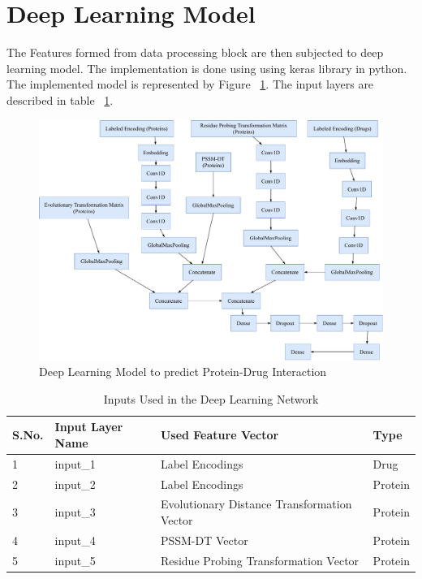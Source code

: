 
  \section{Deep Learning Model}
  
  The Features formed from data processing block are then subjected to deep learning model. The implementation is done using  using keras library in python. The implemented model is represented by Figure ~\ref{fig:dlm}. The input layers are described in table ~\ref{table:inputs}.
  
  \begin{figure}[H]
  \centering
  \includegraphics[width=1\linewidth]{mainmatter/3-Methodology/images/DeepDF.pdf}
  \caption{Deep Learning Model to predict Protein-Drug Interaction}
  \label{fig:dlm}
  \end{figure}
  \begin{table}[H]\centering
    \caption{Inputs Used in the Deep Learning Network} 
    \begin{tabular}{|l|l|l|l|}
      \hline 
      S.No. & Input Layer Name & Used Feature Vector & Type \\ \hline
      1 & input\_1 & Label Encodings & Drug \\ \hline
      2 & input\_2 & Label Encodings & Protein \\ \hline
      3 & input\_3 & Evolutionary Distance Transformation Vector& Protein \\ \hline
      4 & input\_4 & PSSM-DT Vector & Protein \\ \hline
      5 & input\_5 & Residue Probing Transformation Vector & Protein \\   \hline 
    \end{tabular} 
    \label{table:inputs}
  \end{table}
  
